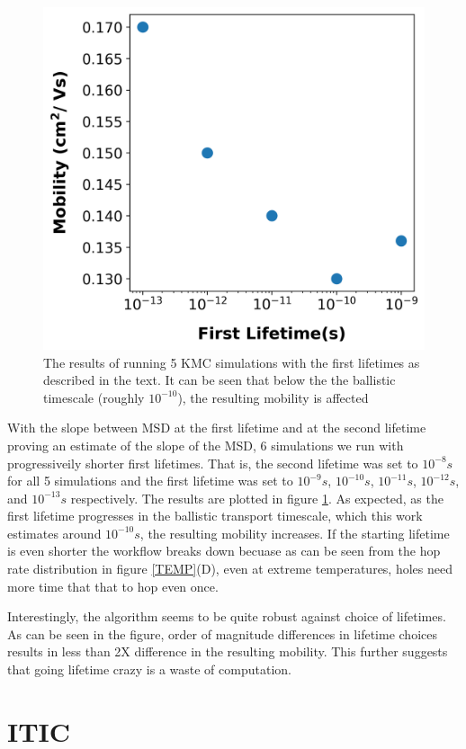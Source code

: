\begin{figure}
  \center
  \includegraphics[width=0.8\linewidth]{figures/lifetime.png} 
    \caption{The results of running 5 KMC simulations with the first lifetimes as described in the text. It
    can be seen that below the the ballistic timescale (roughly $10^{-10}$), the resulting mobility is affected}
  \label{lifetime}
\end{figure}

With the slope between MSD at the first lifetime and at the second lifetime proving an estimate of the slope
of the MSD, 6 simulations we run with progressiveily shorter first lifetimes. That is, the second lifetime was
set to $10^{-8}s$ for all 5 simulations and the first lifetime was set to $10^{-9}s$, $10^{-10}s$,
$10^{-11}s$, $10^{-12}s$, and $10^{-13}s$ respectively. The results are plotted in figure
\ref{lifetime}. As expected, as the first lifetime progresses in the ballistic transport timescale, which this work
estimates around $10^{-10}s$, the resulting mobility increases. If the starting lifetime is even shorter the
workflow breaks down becuase as can be seen from the hop rate distribution in figure \ref{TEMP}(D), even at
extreme temperatures, holes need more time that that to hop even once. 

Interestingly, the algorithm seems to be quite robust against choice of lifetimes. As can be seen in the
figure, order of magnitude differences in lifetime choices results in less than 2X difference in the resulting
mobility. This further suggests that going lifetime crazy is a waste of computation.  

\section{ITIC}

